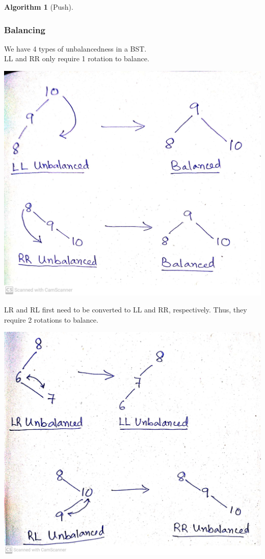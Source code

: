 \documentclass[10pt, a4paper]{extarticle}
\theoremstyle{definition}
\newtheorem{alg}{Algorithm}
\begin{document}
\begin{alg}[Push]
	\subsubsection{Balancing}
	We have 4 types of unbalancedness in a BST.\\
	LL and RR only require 1 rotation to balance.
		\begin{center}
			\includegraphics[scale=0.09]{LL-RR.jpg}\\
		\end{center}
		LR and RL first need to be converted to LL and RR, respectively. Thus, they require 2 rotations to balance.
		\begin{center}
			\includegraphics[scale=0.08]{LR-RL.jpg}\\
		\end{center}


\end{alg}
\end{document}
